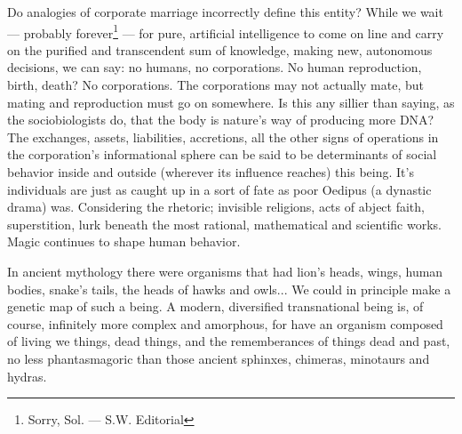 Do analogies of corporate marriage incorrectly define this entity? While we wait --- probably forever\footnote{Sorry, Sol. --- S.W. Editorial} --- for pure, artificial intelligence to come on line and carry on the purified and transcendent sum of knowledge, making new, autonomous decisions, we can say: no humans, no corporations. No human reproduction, birth, death? No corporations. The corporations may not actually mate, but mating and reproduction must go on somewhere. Is this any sillier than saying, as the sociobiologists do, that the body is nature's way of producing more DNA? The exchanges, assets, liabilities, accretions, all the other signs of operations in the corporation's informational sphere can be said to be determinants of social behavior inside and outside (wherever its influence reaches) this being. It's individuals are just as caught up in a sort of fate as poor Oedipus (a dynastic drama) was. Considering the rhetoric; invisible religions, acts of abject faith, superstition, lurk beneath the most rational, mathematical and scientific works. Magic continues to shape human behavior.

In ancient mythology there were organisms that had lion's heads, wings, human bodies, snake's tails, the heads of hawks and owls... We could in principle make a genetic map of such a being. A modern, diversified transnational being is, of course, infinitely more complex and amorphous, for have an organism composed of living we things, dead things, and the rememberances of things dead and past, no less phantasmagoric than those ancient sphinxes, chimeras, minotaurs and hydras.
